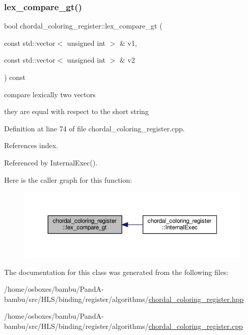 \subsubsection{\texorpdfstring{lex\+\_\+compare\+\_\+gt()}{lex\_compare\_gt()}}
{\footnotesize\ttfamily bool chordal\+\_\+coloring\+\_\+register\+::lex\+\_\+compare\+\_\+gt (\begin{DoxyParamCaption}\item[{const std\+::vector$<$ unsigned int $>$ \&}]{v1,  }\item[{const std\+::vector$<$ unsigned int $>$ \&}]{v2 }\end{DoxyParamCaption}) const\hspace{0.3cm}{\ttfamily [private]}}



compare lexically two vectors 

they are equal with respect to the short string 

Definition at line 74 of file chordal\+\_\+coloring\+\_\+register.\+cpp.



References index.



Referenced by Internal\+Exec().

Here is the caller graph for this function\+:
\nopagebreak
\begin{figure}[H]
\begin{center}
\leavevmode
\includegraphics[width=350pt]{d9/db4/classchordal__coloring__register_abef21ed03d914721aabd0cad2160fbb7_icgraph}
\end{center}
\end{figure}


The documentation for this class was generated from the following files\+:\begin{DoxyCompactItemize}
\item 
/home/osboxes/bambu/\+Pand\+A-\/bambu/src/\+H\+L\+S/binding/register/algorithms/\hyperlink{chordal__coloring__register_8hpp}{chordal\+\_\+coloring\+\_\+register.\+hpp}\item 
/home/osboxes/bambu/\+Pand\+A-\/bambu/src/\+H\+L\+S/binding/register/algorithms/\hyperlink{chordal__coloring__register_8cpp}{chordal\+\_\+coloring\+\_\+register.\+cpp}\end{DoxyCompactItemize}
